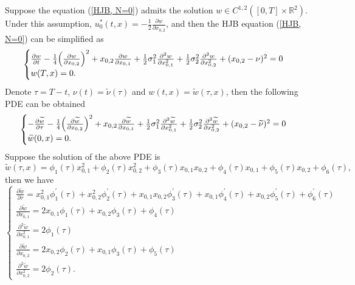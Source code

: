 \documentclass{article}
\begin{document}
Suppose the equation (\ref{HJB, N=0}) admits the solution $w \in C^{1, 2}([0, T] \times \mathbb{R}^{2})$. Under this assumption, $u_{0}^{*}(t, x) = - \frac{1}{2} \frac{\partial w}{\partial x_{0, 2}}$, and then the HJB equation (\ref{HJB, N=0}) can be simplified as
\begin{equation*} 
    \begin{cases}
   \frac{\partial w}{\partial t} -  \frac{1}{4} \Big{(} \frac{\partial w}{\partial x_{0, 2}} \Big{)}^{2} + x_{0,2} \frac{\partial w}{\partial x_{0, 1}}  + \frac{1}{2} \sigma_{1}^{2} \frac{\partial^{2} w}{\partial x_{0, 1}^{2}} + \frac{1}{2} \sigma_{2}^{2} \frac{\partial^{2} w}{\partial x_{0, 2}^{2}} + (x_{0,2} - \nu)^{2} = 0  \\
   w(T, x) = 0.
   \end{cases}
\end{equation*}
Denote $\tau = T-t$, $\nu(t) = \widetilde{\nu} (\tau)$ and $w(t, x) = \widetilde{w}(\tau, x)$, then the following PDE can be obtained
\begin{equation*}
    \begin{cases}
   - \frac{\partial \widetilde{w}}{\partial \tau} -  \frac{1}{4} \Big{(} \frac{\partial \widetilde{w}}{\partial x_{0, 2}} \Big{)}^{2} + x_{0,2} \frac{\partial \widetilde{w}}{\partial x_{0, 1}}  + \frac{1}{2} \sigma_{1}^{2} \frac{\partial^{2} \widetilde{w}}{\partial x_{0, 1}^{2}} + \frac{1}{2} \sigma_{2}^{2} \frac{\partial^{2} \widetilde{w}}{\partial x_{0, 2}^{2}} + (x_{0,2} - \widetilde{\nu})^{2} = 0  \\
   \widetilde{w}(0, x) = 0.
   \end{cases}
\end{equation*}
Suppose the solution of the above PDE is
\begin{equation} \label{solution form}
    \widetilde{w}(\tau, x) = \phi_{1}(\tau) x_{0, 1}^{2} + \phi_{2}(\tau) x_{0, 2}^{2} + \phi_{3}(\tau) x_{0, 1} x_{0, 2} + \phi_{4}(\tau) x_{0, 1} + \phi_{5}(\tau) x_{0, 2} + \phi_{6} (\tau),
\end{equation}
then we have
\begin{equation*}
    \begin{cases}
   \frac{\partial \widetilde{w}}{\partial \tau} = x_{0, 1}^{2} \phi_{1}^{'} (\tau) + x_{0, 2}^{2} \phi_{2}^{'} (\tau) + x_{0, 1} x_{0, 2} \phi_{3}^{'} (\tau) + x_{0, 1} \phi_{4}^{'} (\tau) + x_{0, 2} \phi_{5}^{'} (\tau) + \phi_{6}^{'} (\tau) \\
   \frac{\partial \widetilde{w}}{\partial x_{0, 1}} = 2 x_{0, 1} \phi_{1} (\tau) + x_{0, 2} \phi_{3}(\tau) + \phi_{4}(\tau) \\
   \frac{\partial^{2} \widetilde{w}}{\partial x_{0, 1}^{2}} = 2 \phi_{1}(\tau) \\
   \frac{\partial \widetilde{w}}{\partial x_{0, 2}} = 2 x_{0, 2} \phi_{2} (\tau) + x_{0, 1} \phi_{3}(\tau) + \phi_{5}(\tau) \\
   \frac{\partial^{2} \widetilde{w}}{\partial x_{0, 2}^{2}} = 2 \phi_{2}(\tau).
   \end{cases}
\end{equation*}
\end{document}
